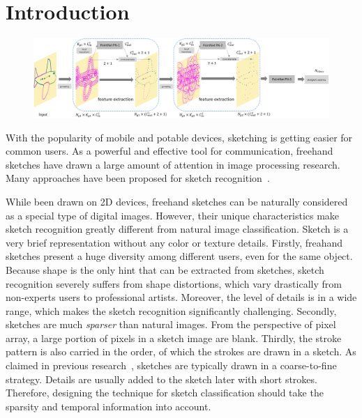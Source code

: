 \section{Introduction}
\label{sec:intro}

 
 \begin{figure} 
 	\center
 	\includegraphics[width=\textwidth]{images/sketchpointnet.png}
 	\label{fig:sketchpointnet}
 \end{figure}


With the popularity of mobile and potable devices, sketching is getting easier for common users. As a powerful and effective tool for communication, freehand sketches have drawn a large amount of attention in image processing research.
Many approaches have been proposed for sketch recognition~\cite{Eitz2012HowDH, LiHSG15, Schneider2014SketchCA, Yu2015SketchaNetTB, Seddati2015DeepSketchDC, Dupont2016DeepSketch2D}.


While been drawn on 2D devices, freehand sketches can be naturally considered as a special type of digital images.
However, their unique characteristics make sketch recognition greatly different from natural image classification.
%
Sketch is a very brief representation without any color or texture details.
Firstly, freahand sketches present a huge diversity among different users, even for the same object.
%
Because shape is the only hint that can be extracted from sketches, sketch recognition severely suffers from shape distortions, which vary drastically from non-experts users to professional artists.
Moreover, the level of details is in a wide range, which makes the sketch recognition significantly challenging.
%
Secondly, sketches are much \emph{sparser} than natural images.
From the perspective of pixel array, a large portion of pixels in a sketch image are blank.
Thirdly, the stroke pattern is also carried in the order, of which the strokes are drawn in a sketch. As claimed in previous research~\cite{Eitz2012HowDH}, sketches are typically drawn in a coarse-to-fine strategy. Details are usually added to the sketch later with short strokes.
Therefore, designing the technique for sketch classification should take the sparsity and temporal information into account.



